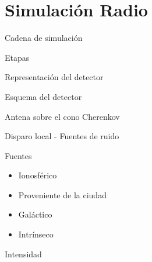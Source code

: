 \section[Simulaci\'on]{Simulaci\'on Radio}



\begin{frame}{Cadena de simulaci\'on}
\footnotesize
	\begin{block}{Etapas}
		\begin{center}
		\end{center}
	\end{block}
\end{frame}



\begin{frame}{Representaci\'on del detector}
\footnotesize
	\begin{block}{Esquema del detector}
		\begin{center}
		\end{center}
	\end{block}
	\begin{alertblock}{Antena sobre el cono Cherenkov}
	\begin{center}
		\hspace*{2mm}
	\end{center}
	\end{alertblock}
\end{frame}

\begin{frame}{Disparo local - Fuentes de ruido}
\footnotesize
	\begin{exampleblock}{Fuentes}
	\begin{itemize}
	 \item Ionosf\'erico
	 \item Proveniente de la ciudad
	 \item Gal\'actico
	 \item Intr\'inseco
	\end{itemize}
	\end{exampleblock}
	\begin{block}{Intensidad}
		\begin{center}
		\end{center}
	\end{block}
	\vspace*{-1cm}
\end{frame}
